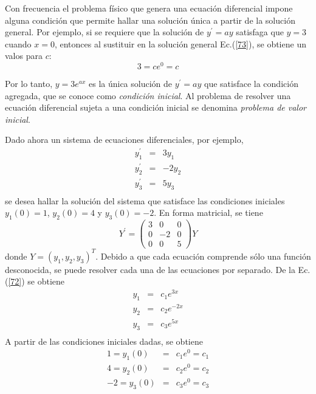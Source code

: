   Con frecuencia el problema físico que genera una ecuación diferencial impone alguna condición que permite hallar una solución única a partir de la solución general. Por ejemplo, si se requiere que la solución de $y^\prime=ay$ satisfaga que $y=3$ cuando $x=0$, entonces al sustituir en la solución general Ec.(\ref{73}), se obtiene un valos para $c$:
  \begin{equation}
  3=c  e^{0}=c
  \label{74}
  \end{equation}
  
  Por lo tanto, $y=3 e^{ax}$ es la única solución de $y^\prime=ay$ que satisface la condición agregada, que se conoce como \textit{condición inicial}. Al problema de resolver una ecuación diferencial sujeta a una condición inicial se denomina \textit{problema de valor inicial}.
  
  Dado ahora un sistema de ecuaciones diferenciales, por ejemplo, 
  \begin{eqnarray}
  y^\prime_1&=&3y_1 \nonumber\\
  y^\prime_2&=&-2y_2\nonumber\\
  y^\prime_3&=&5y_3 \nonumber\\
  \label{75}
  \end{eqnarray} 
  se desea hallar la solución del sistema que satisface las condiciones iniciales $y_1(0)=1$, $y_2(0)= 4$ y $y_3(0)=-2$.
  En forma matricial, se tiene  
  \begin{equation}
  Y^\prime=\left(\begin{array}{ccc} 3 & 0  & 0  \\0 & -2 & 0 \\0  & 0 & 5
\end{array}
 \right)Y
 \label{76}
  \end{equation}
  donde $Y=(y_1, y_2, y_3)^T$.
  Debido a que cada ecuación comprende sólo una función desconocida, se puede resolver cada una de las ecuaciones  por separado. De la Ec.(\ref{72}) se obtiene
  \begin{eqnarray*}
  y_1&=&c_1e^{3x} \nonumber\\
  y_2&=&c_2e^{-2x}\nonumber\\
  y_3&=&c_3e^{5x} \nonumber\\
  \end{eqnarray*} 
  A partir de las condiciones iniciales dadas, se obtiene
  \begin{eqnarray}
 1= y_1(0)&=&c_1e^{0}=c_1\nonumber\\
  4=y_2(0)&=&c_2e^{0}=c_2\nonumber\\
  -2=y_3(0)&=&c_3e^{0}=c_3 \nonumber\\
  \label{77}
  \end{eqnarray}
